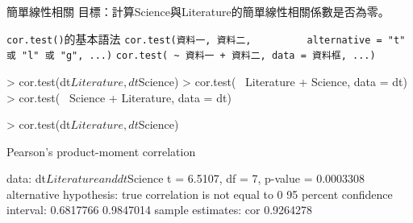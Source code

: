 \documentclass[14pt, aspectratio=43]{beamer}
\begin{document}
\begin{frame}{簡單線性相關}
目標：計算Science與Literature的簡單線性相關係數是否為零。
\begin{block}{\texttt{cor.test()}的基本語法}
\verb+cor.test(資料一, 資料二,+
\verb+         alternative = "t" 或 "l" 或 "g", ...)+
\verb#cor.test( ~ 資料一 + 資料二, data = 資料框, ...)#
\end{block}
\begin{RC}
> cor.test(dt$Literature, dt$Science)
> cor.test(~ Literature + Science, data = dt)
> cor.test(~ Science + Literature, data = dt)
\end{RC}

\framebreak

\begin{RC}
> cor.test(dt$Literature, dt$Science)
\end{RC}
\begin{R}
	Pearson's product-moment correlation

data:  dt$Literature and dt$Science
t = 6.5107, df = 7, p-value = 0.0003308
alternative hypothesis: true correlation is not equal to 0
95 percent confidence interval:
 0.6817766 0.9847014
sample estimates:
      cor 
0.9264278
\end{R}
\end{frame}
\end{document}
